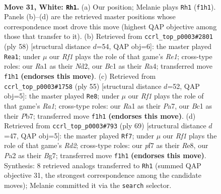 \documentclass[11pt]{article}
\begin{document}
\clearpage

\begin{figure}[p]\centering
\begin{subfigure}{0.46\textwidth}\centering
\resizebox{\linewidth}{!}{%
\newchessgame
\chessboard[
  setfen={r3k2r/5p2/5n2/8/p3p2p/3p3P/PP3P2/R1BK1R2 w q - 2 31},
  showmover=false,
  pgfstyle=straightmove, color=movearrow, markmove={f1-h1}
]}
\caption{}
\end{subfigure}\hfill
\begin{subfigure}{0.46\textwidth}\centering
\resizebox{\linewidth}{!}{%
\newchessgame
\chessboard[
  setfen={1r4k1/5pp1/4rnp1/4p3/R7/3PP2P/3N2P1/4R1K1 w - - 0 30},
  showmover=false,
  pgfstyle=straightmove, color=movearrow, markmove={e1-a1}
]}
\caption{}
\end{subfigure}
\\[4pt]
\begin{subfigure}{0.46\textwidth}\centering
\resizebox{\linewidth}{!}{%
\newchessgame
\chessboard[
  setfen={r5k1/pp1b3r/7p/4R3/3p4/P4N2/2P3PP/R5K1 b - - 2 28},
  showmover=false,
  pgfstyle=straightmove, color=movearrow, markmove={a8-e8}
]}
\caption{}
\end{subfigure}\hfill
\begin{subfigure}{0.46\textwidth}\centering
\resizebox{\linewidth}{!}{%
\newchessgame
\chessboard[
  setfen={4r3/1k1r2bp/1p1p4/p2N4/2P2P2/1P5P/2R3K1/3R4 b - - 0 35},
  showmover=false,
  pgfstyle=straightmove, color=movearrow, markmove={d7-f7}
]}
\caption{}
\end{subfigure}
\caption{\textbf{Move 31, White: \texttt{Rh1}.} (a) Our position; Melanie plays \texttt{Rh1} (\texttt{f1h1}). Panels (b)--(d) are the retrieved master positions whose correspondence most drove this move (highest QAP objective among those that transfer to it). (b) Retrieved from \texttt{ccrl\_top\_p0003\#2801} (ply 58) [structural distance $d$=54, QAP obj=6]: the master played \texttt{Rea1}; under $\mu$ our \emph{Rf1} plays the role of that game's \emph{Re1}; cross-type roles: our \emph{R}a1 as their \emph{N}d2, our \emph{B}c1 as their \emph{R}a4; transferred move \texttt{f1h1} \textbf{(endorses this move)}. (c) Retrieved from \texttt{ccrl\_top\_p0003\#1758} (ply 55) [structural distance $d$=52, QAP obj=5]: the master played \texttt{Re8}; under $\mu$ our \emph{Rf1} plays the role of that game's \emph{Ra1}; cross-type roles: our \emph{R}a1 as their \emph{P}a7, our \emph{B}c1 as their \emph{P}b7; transferred move \texttt{f1h1} \textbf{(endorses this move)}. (d) Retrieved from \texttt{ccrl\_top\_p0003\#793} (ply 69) [structural distance $d$=47, QAP obj=5]: the master played \texttt{Rf7}; under $\mu$ our \emph{Rf1} plays the role of that game's \emph{Rd2}; cross-type roles: our \emph{p}f7 as their \emph{R}e8, our \emph{P}a2 as their \emph{B}g7; transferred move \texttt{f1h1} \textbf{(endorses this move)}. Synthesis: 8 retrieved analogs transferred to \texttt{Rh1} (summed QAP objective 31, the strongest correspondence among the candidate moves); Melanie committed it via the \texttt{search} selector.}
\label{fig:thought-m60}
\end{figure}
\end{document}
